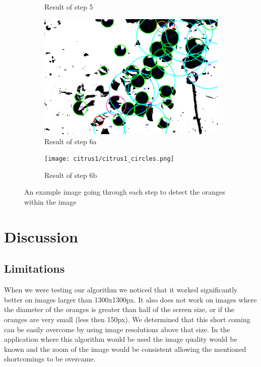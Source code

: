 \documentclass[conference]{IEEEtran}
\begin{document}
\begin{figure}
\begin{subfigure}{.33\linewidth}
  	\caption{Result of step 5}
  \end{subfigure}\par\medskip
  \begin{subfigure}{.5\linewidth}
  	\includegraphics[width=\linewidth]{citrus1/citrus1_circles_mask.png}\hfill
	   	\caption{Result of step 6a}
  \end{subfigure}
  \begin{subfigure}{.5\linewidth}
  	\texttt{[image: citrus1/citrus1\_circles.png]}\hfill
 	 \caption{Result of step 6b}
  \end{subfigure}
  \caption{An example image going through each step to detect the oranges within the image }
\end{figure}


\section{Discussion}

\subsection{Limitations}

When we were testing our algorithm we noticed that it worked significantly better on images larger than 1300x1300px. It also does not work on images where the diameter of the oranges is greater than half of the screen size, or if the oranges are very small (less then 150px). We determined that this short coming can be easily overcome by using image resolutions above that size. In the application where this algorithm would be used the image quality would be known and the zoom of the image would be consistent allowing the mentioned shortcomings to be overcame. 










\vspace{12pt}
\end{document}
